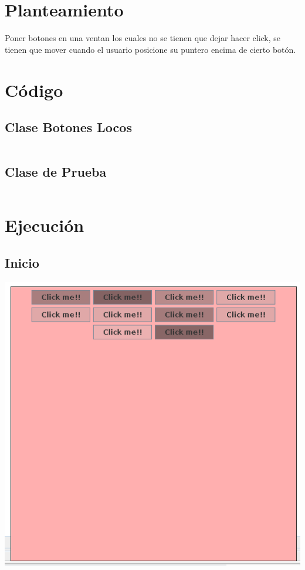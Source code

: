 \documentclass[12pt]{article}
\author{Pablo Vargas Bermúdez}
\begin{document}
\pagestyle{empty}

\section*{Planteamiento}

Poner botones en una ventan los cuales no se tienen que dejar hacer
click, se tienen que mover cuando el usuario posicione su puntero
encima de cierto botón.

\section*{Código}

\subsection*{Clase Botones Locos}

\inputminted{Java}{CrazyButtons.java}

\subsection*{Clase de Prueba}

\inputminted{Java}{Prueba.java}

\section*{Ejecución}

\subsection*{Inicio}

\includegraphics[width=\textwidth]{Ejecucion3.png}
\end{document}
